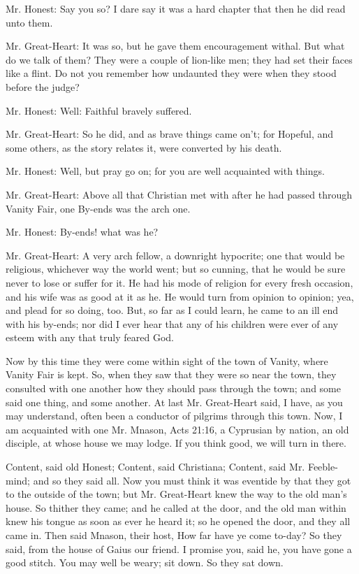 Mr. Honest: Say you so? I dare say it was a hard chapter that then he did read unto them.

Mr. Great-Heart: It was so, but he gave them encouragement withal. But what do we talk of them? They were a couple of lion-like men; they had set their faces like a flint. Do not you remember how undaunted they were when they stood before the judge?

Mr. Honest: Well: Faithful bravely suffered.

Mr. Great-Heart: So he did, and as brave things came on't; for Hopeful, and some others, as the story relates it, were converted by his death.

Mr. Honest: Well, but pray go on; for you are well acquainted with things.

Mr. Great-Heart: Above all that Christian met with after he had passed through Vanity Fair, one By-ends was the arch one.

Mr. Honest: By-ends! what was he?

Mr. Great-Heart: A very arch fellow, a downright hypocrite; one that would be religious, whichever way the world went; but so cunning, that he would be sure never to lose or suffer for it. He had his mode of religion for every fresh occasion, and his wife was as good at it as he. He would turn from opinion to opinion; yea, and plead for so doing, too. But, so far as I could learn, he came to an ill end with his by-ends; nor did I ever hear that any of his children were ever of any esteem with any that truly feared God.

Now by this time they were come within sight of the town of Vanity, where Vanity Fair is kept. So, when they saw that they were so near the town, they consulted with one another how they should pass through the town; and some said one thing, and some another. At last Mr. Great-Heart said, I have, as you may understand, often been a conductor of pilgrims through this town. Now, I am acquainted with one Mr. Mnason, Acts 21:16, a Cyprusian by nation, an old disciple, at whose house we may lodge. If you think good, we will turn in there.

Content, said old Honest; Content, said Christiana; Content, said Mr. Feeble-mind; and so they said all. Now you must think it was eventide by that they got to the outside of the town; but Mr. Great-Heart knew the way to the old man's house. So thither they came; and he called at the door, and the old man within knew his tongue as soon as ever he heard it; so he opened the door, and they all came in. Then said Mnason, their host, How far have ye come to-day? So they said, from the house of Gaius our friend. I promise you, said he, you have gone a good stitch. You may well be weary; sit down. So they sat down.

